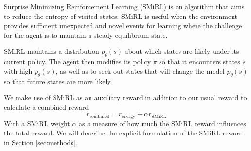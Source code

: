 Surprise Minimizing Reinforcement Learning (SMiRL) is an algorithm that aims to reduce 
the entropy of visited states. SMiRL is useful when the environment 
provides sufficient unexpected and novel events for learning 
where the challenge for the agent is to maintain a 
steady equilibrium state. \citep{smirl}

SMiRL maintains a distribution $ p_{\theta}(s) $ about which states are likely under its current 
policy. The agent then modifies its policy $ \pi $ so that it encounters states $ s $ 
with high $ p_{\theta}(s) $, as well as to seek out states that will change the model $ p_{\theta}(s) $ so 
that future states are more likely. 

We make use of SMiRL as an auxiliary reward in addition to our 
usual reward to calculate a combined reward
$$ r_{\text{combined}} = r_{\text{energy}} + \alpha r_{\text{SMiRL}} $$
With a SMiRL weight $ \alpha $ as a measure of how much the SMiRL reward influences
the total reward. 
We will describe the explicit formulation of the SMiRL reward in Section \ref{sec:methods}. 
